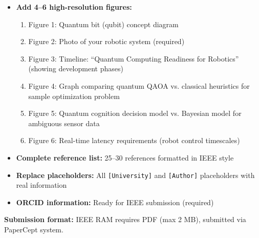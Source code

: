 \documentclass[conference]{IEEEtran}
\begin{document}
\begin{itemize}
\item \textbf{Add 4--6 high-resolution figures:}
\begin{enumerate}
\item Figure 1: Quantum bit (qubit) concept diagram
\item Figure 2: Photo of your robotic system (required)
\item Figure 3: Timeline: ``Quantum Computing Readiness for Robotics'' (showing development phases)
\item Figure 4: Graph comparing quantum QAOA vs. classical heuristics for sample optimization problem
\item Figure 5: Quantum cognition decision model vs. Bayesian model for ambiguous sensor data
\item Figure 6: Real-time latency requirements (robot control timescales)
\end{enumerate}

\item \textbf{Complete reference list:} 25--30 references formatted in IEEE style

\item \textbf{Replace placeholders:} All \texttt{[University]} and \texttt{[Author]} placeholders with real information

\item \textbf{ORCID information:} Ready for IEEE submission (required)
\end{itemize}

\textbf{Submission format:} IEEE RAM requires PDF (max 2 MB), submitted via PaperCept system.
\end{document}
